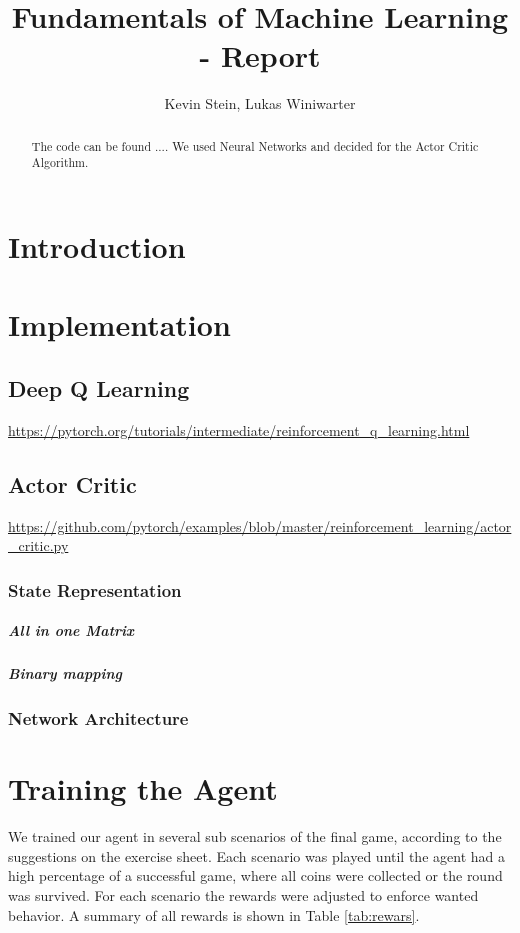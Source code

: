 \documentclass[]{scrartcl}
\title{Fundamentals of Machine Learning - Report}
\author{Kevin Stein, Lukas Winiwarter}
\begin{document}
\maketitle

\begin{abstract}
	The code can be found .... We used Neural Networks and decided for the Actor Critic Algorithm.

\end{abstract}
\tableofcontents
\newpage
\section{Introduction}

\newpage
\section{Implementation}

\newpage
\subsection{Deep Q Learning}
\url{https://pytorch.org/tutorials/intermediate/reinforcement_q_learning.html}

\newpage
\subsection{Actor Critic}

\url{https://github.com/pytorch/examples/blob/master/reinforcement_learning/actor_critic.py}

\newpage
\subsubsection{State Representation}
\subparagraph{All in one Matrix}
\subparagraph{Binary mapping}

\newpage
\subsubsection{Network Architecture}

\newpage
\section{Training the Agent}
We trained our agent in several sub scenarios of the final game, according to the suggestions on the exercise sheet. Each scenario was played until the agent had a high percentage of a successful game, where all coins were collected or the round was survived. For each scenario the rewards were adjusted to enforce wanted behavior. A summary of all rewards is shown in Table \ref{tab:rewars}.
\end{document}
